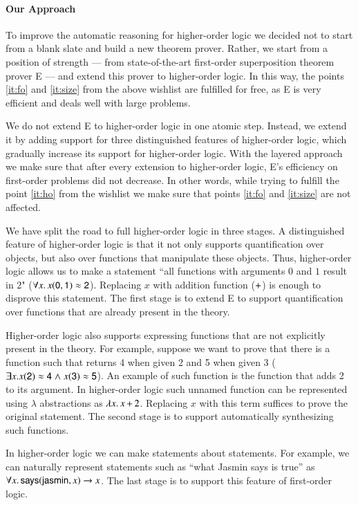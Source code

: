 \paragraph{Our Approach} To improve the automatic reasoning for higher-order
logic we decided not to start from a blank slate and build a new theorem prover.
Rather, we start from a position of strength --- from state-of-the-art
first-order superposition theorem prover E \cite{scv-19-e23} --- and extend this
prover to higher-order logic. In this way, the points \ref{it:fo} and
\ref{it:size} from the above wishlist are fulfilled for free, as E is very
efficient and deals well with large problems.

We do not extend E to higher-order logic in one atomic step. Instead, we extend
it by adding support for three distinguished features of higher-order logic,
which gradually increase its support for higher-order logic. With the layered
approach we make sure that after every extension to higher-order logic, E's
efficiency on first-order problems did not decrease. In other words, while trying
to fulfill the point \ref{it:ho} from the wishlist we make sure that points
\ref{it:fo} and \ref{it:size} are not affected.

We have split the road to full higher-order logic in three stages. A
distinguished feature of higher-order logic is that it not only supports
quantification over objects, but also over functions that manipulate these
objects. Thus, higher-order logic allows us to make a statement ``all functions
with arguments $0$ and $1$ result in $2$" ($\forall x. \,  x (\mathsf{0}, \mathsf{1}) \approx
\mathsf{2}$). Replacing $x$ with addition function ($\mathsf{+}$) is enough to
disprove this statement. The first stage is to extend E to support
quantification over functions that are already present in the theory.

Higher-order logic also supports expressing functions that are not explicitly
present in the theory. For example, suppose we want to prove that there is a
function such that returns 4 when given 2 and 5 when given 3 ($\exists x.
x(\mathsf{2}) \approx \mathsf{4} \mathrel\land x (\mathsf{3}) \approx \mathsf{5} $). An example of such
function is the function that adds 2 to its argument. In higher-order logic such
unnamed function can be represented using $\lambda$ abstractions as $\lambda
x.\, x \, \mathsf{+} \, 2$. Replacing $x$ with this term suffices to prove the
original statement. The second stage is to support automatically synthesizing
such functions.

In higher-order logic we can make statements about statements. For example, we
can naturally represent statements such as ``what Jasmin says is true'' as
$\forall x. \, \mathsf{says}(\mathsf{jasmin}, x) \rightarrow x$. The last stage is to support this
feature of first-order logic.

